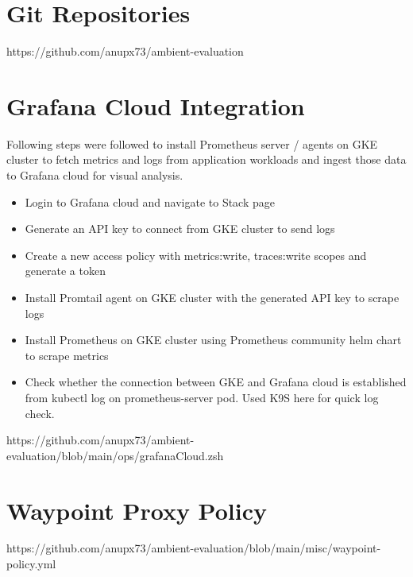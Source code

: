\appendix

\section{Git Repositories}
\label{appendix:researchRepo}
https://github.com/anupx73/ambient-evaluation


\section{Grafana Cloud Integration}
\label{appendix:grafana}
Following steps were followed to install Prometheus server / agents on GKE cluster to fetch metrics and logs from application workloads and ingest those data to Grafana cloud for visual analysis. 

\begin{itemize}
\item Login to Grafana cloud and navigate to Stack page
\item Generate an API key to connect from GKE cluster to send logs
\item Create a new access policy with metrics:write, traces:write scopes and generate a token
\item Install Promtail agent on GKE cluster with the generated API key to scrape logs
\item Install Prometheus on GKE cluster using Prometheus community helm chart to scrape metrics
\item Check whether the connection between GKE and Grafana cloud is established from kubectl log on prometheus-server pod. Used K9S here for quick log check.
\end{itemize}

https://github.com/anupx73/ambient-evaluation/blob/main/ops/grafanaCloud.zsh

\section{Waypoint Proxy Policy}
\label{appendix:waypoint}
https://github.com/anupx73/ambient-evaluation/blob/main/misc/waypoint-policy.yml
